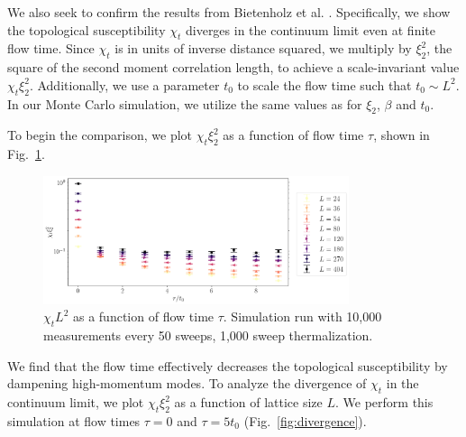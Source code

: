 \documentclass[a4paper,11pt]{article}
\begin{document}
We also seek to confirm the results from Bietenholz et al. \cite{bietenholz2018}. Specifically, we show the topological susceptibility $\chi_t$ diverges in the continuum limit even at finite flow time. Since $\chi_t$ is in units of inverse distance squared, we multiply by $\xi_2^2$, the square of the second moment correlation length, to achieve a scale-invariant value $\chi_t\xi_2^2$. Additionally, we use a parameter $t_0$ to scale the flow time such that $t_0\sim L^2$. In our Monte Carlo simulation, we utilize the same values as \cite{bietenholz2018} for $\xi_2$, $\beta$ and $t_0$.

To begin the comparison, we plot $\chi_t\xi_2^2$ as a function of flow time $\tau$, shown in Fig.~\ref{fig:bietenholz}.
\begin{figure}[h!]
    \centering
      \includegraphics[width=0.8\textwidth]{bietenholz.png}
      \caption{\label{fig:bietenholz} $\chi_t L^2$ as a  function of flow time $\tau$. Simulation run with 10,000 measurements every 50 sweeps, 1,000 sweep thermalization.}
\end{figure}
We find that the flow time effectively decreases the topological susceptibility by dampening high-momentum modes. To analyze the divergence of $\chi_t$ in the continuum limit, we plot $\chi_t \xi_2^2$ as a function of lattice size $L$. We perform this simulation at flow times $\tau=0$ and $\tau=5t_0$ (Fig.~\ref{fig:divergence}).
\end{document}
